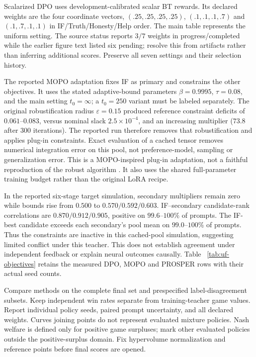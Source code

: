 \documentclass{article}
\makeatletter
\let\revieworiginalref\ref
\newcommand{\reviewref}[1]{%
  \@ifundefined{r@#1}{\textnormal{[original-draft ref.: \texttt{\detokenize{#1}}]}}%
  {\revieworiginalref{#1}}}
\let\ref\reviewref
\theoremstyle{remark}
\theoremstyle{plain}
\makeatother
\begin{document}
Scalarized DPO \citep{rafailov2023direct} uses development-calibrated scalar BT rewards. Its declared weights are the four coordinate vectors, $(.25,.25,.25,.25)$, $(.1,.1,.1,.7)$ and $(.1,.7,.1,.1)$ in IF/Truth/Honesty/Help order. The main table represents the uniform setting. The source status reports $3/7$ weights in progress/completed while the earlier figure text listed six pending; resolve this from artifacts rather than inferring additional scores. Preserve all seven settings and their selection history.

The reported MOPO adaptation fixes IF as primary and constrains the other objectives. It uses the stated adaptive-bound parameters $\beta=0.9995$, $\tau=0.08$, and the main setting $t_0=\infty$; a $t_0=250$ variant must be labeled separately. The original robustification radius $\varepsilon=0.15$ produced reference constraint deficits of $0.061$--$0.083$, versus nominal slack $2.5\times10^{-4}$, and an increasing multiplier ($73.8$ after $300$ iterations). The reported run therefore removes that robustification and applies plug-in constraints. Exact evaluation of a cached tensor removes numerical integration error on this pool, not preference-model, sampling or generalization error. This is a MOPO-inspired plug-in adaptation, not a faithful reproduction of the robust algorithm \citep{agnihotri2026mopo}. It also uses the shared full-parameter training budget rather than the original LoRA recipe.

In the reported six-stage target simulation, secondary multipliers remain zero while bounds rise from $0.500$ to $0.570/0.592/0.603$. IF--secondary candidate-rank correlations are $0.870/0.912/0.905$, positive on $99.6$--$100\%$ of prompts. The IF-best candidate exceeds each secondary's pool mean on $99.0$--$100\%$ of prompts. Thus the constraints are inactive in this cached-pool simulation, suggesting limited conflict under this teacher. This does not establish agreement under independent feedback or explain neural outcomes causally. Table~\ref{tab:uf-objectives} retains the measured DPO, MOPO and PROSPER rows with their actual seed counts.

Compare methods on the complete final set and prespecified label-disagreement subsets. Keep independent win rates separate from training-teacher game values. Report individual policy seeds, paired prompt uncertainty, and all declared weights. Curves joining points do not represent evaluated mixture policies. Nash welfare is defined only for positive game surpluses; mark other evaluated policies outside the positive-surplus domain. Fix hypervolume normalization and reference points before final scores are opened.
\end{document}
